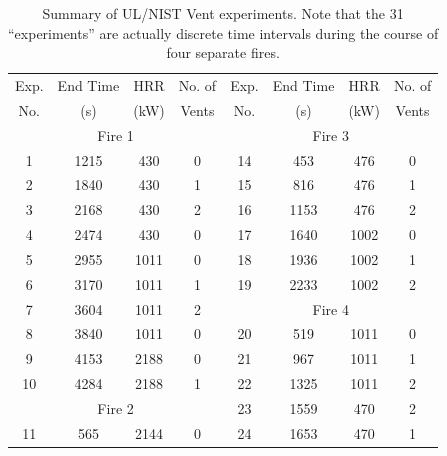 \begin{table}[h!]
\caption[Summary of UL/NIST Vent experiments]{Summary of UL/NIST Vent experiments. Note that the 31 ``experiments'' are actually discrete time intervals during the course of four separate fires.}
\begin{center}
\begin{tabular}{|c|c|c|c||c|c|c|c|}
\hline
Exp.    & End Time  & HRR           &  No. of   & Exp.    & End Time  & HRR           &  No. of           \\
No.     & (s)       & (kW)          & Vents     & No.     & (s)       & (kW)          & Vents             \\ \hline \hline
\multicolumn{4}{|c||}{Fire 1}                   & \multicolumn{4}{|c|}{Fire 3}                            \\ \hline
1       & 1215      & 430           & 0         & 14      & 453       & 476           & 0                 \\ \hline
2       & 1840      & 430           & 1         & 15      & 816       & 476           & 1                 \\ \hline
3       & 2168      & 430           & 2         & 16      & 1153      & 476           & 2                 \\ \hline
4       & 2474      & 430           & 0         & 17      & 1640      & 1002          & 0                 \\ \hline
5       & 2955      & 1011          & 0         & 18      & 1936      & 1002          & 1                 \\ \hline
6       & 3170      & 1011          & 1         & 19      & 2233      & 1002          & 2                 \\ \hline
7       & 3604      & 1011          & 2         & \multicolumn{4}{|c|}{Fire 4}                            \\ \hline
8       & 3840      & 1011          & 0         & 20      & 519       & 1011          & 0                 \\ \hline
9       & 4153      & 2188          & 0         & 21      & 967       & 1011          & 1                 \\ \hline
10      & 4284      & 2188          & 1         & 22      & 1325      & 1011          & 2                 \\ \hline
\multicolumn{4}{|c||}{Fire 2}                   & 23      & 1559      & 470           & 2                 \\ \hline
11      & 565       & 2144          & 0         & 24      & 1653      & 470           & 1                 \\ \hline

\end{tabular}
\end{center}
\end{table}
